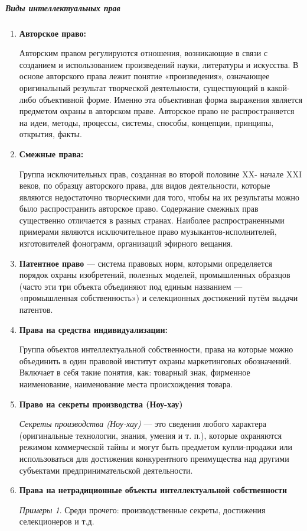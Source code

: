 \documentclass[11pt]{article}
\theoremstyle{plain} %
\theoremstyle{definition} %
\theoremstyle{remark} %
\newtheorem*{nonum}{Примеры}
\begin{document}
\subparagraph{Виды интеллектуальных прав}
\begin{enumerate}
	\item \textbf{Авторское право:}

	Авторским правом регулируются отношения, возникающие в связи с созданием и использованием произведений науки, литературы и искусства. В основе авторского права лежит понятие «произведения», означающее оригинальный результат творческой деятельности, существующий в какой-либо объективной форме. Именно эта объективная форма выражения является предметом охраны в авторском праве. Авторское право не распространяется на идеи, методы, процессы, системы, способы, концепции, принципы, открытия, факты.
	\item \textbf{Смежные права:}

	Группа исключительных прав, созданная во второй половине XX- начале XXI веков, по образцу авторского права, для видов деятельности, которые являются недостаточно творческими для того, чтобы на их результаты можно было распространить авторское право. Содержание смежных прав существенно отличается в разных странах. Наиболее распространенными примерами являются исключительное право музыкантов-исполнителей, изготовителей фонограмм, организаций эфирного вещания.
	\item \textbf{Патентное право} --- система правовых норм, которыми определяется порядок охраны изобретений, полезных моделей, промышленных образцов (часто эти три объекта объединяют под единым названием — «промышленная собственность») и селекционных достижений путём выдачи патентов.
	\item \textbf{Права на средства индивидуализации:}

	Группа объектов интеллектуальной собственности, права на которые можно объединить в один правовой институт охраны маркетинговых обозначений. Включает в себя такие понятия, как: товарный знак, фирменное наименование, наименование места происхождения товара.
	\item \textbf{Право на секреты производства (Ноу-хау)}

	\textit{Секреты производства (Ноу-хау)} — это сведения любого характера (оригинальные технологии, знания, умения и т. п.), которые охраняются режимом коммерческой тайны и могут быть предметом купли-продажи или использоваться для достижения конкурентного преимущества над другими субъектами предпринимательской деятельности.
	\item \textbf{Права на нетрадиционные объекты интеллектуальной собственности}
	\begin{nonum}
		Среди прочего: производственные секреты, достижения селекционеров и т.д.
	\end{nonum}
\end{enumerate}
\newpage
\end{document}
